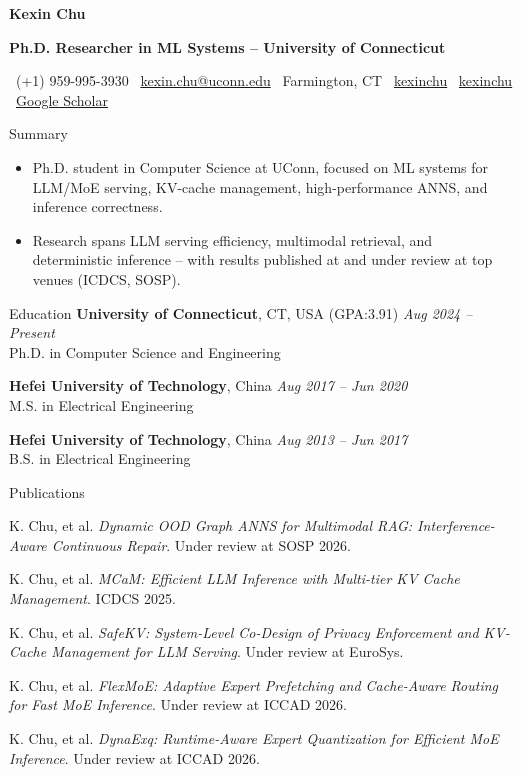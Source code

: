 \documentclass[]{resume}
\newcommand{\sectionvspace}{\vspace{1.5pt}}
\newcommand{\MakeHeader}[8]{%
\noindent
{\centering \bfseries \LARGE #1 \par}
\vspace{2pt}

\noindent
\colorbox{HeaderOrange}{%
  \parbox{\textwidth}{%
    \vspace{2pt}
    \centering
    {\color{white}\bfseries\normalsize #2}
    \vspace{2pt}
  }%
}\par

\noindent
\colorbox{HeaderLight}{%
  \parbox{\textwidth}{%
    \vspace{2pt}
    \small
    \faPhone\ #3 \hfill
    \faEnvelope\ \href{mailto:#4}{#4} \hfill
    \faMapMarker*\ #5 \hfill
    \faLinkedin\ \href{#6}{kexinchu} \hfill
    \faGithub\ \href{#7}{kexinchu} \hfill
    \faGraduationCap\ \href{#8}{Google Scholar}
    \vspace{2pt}
  }%
}\par
}
\begin{document}
\MakeHeader
{Kexin Chu}
{Ph.D. Researcher in ML Systems -- University of Connecticut}
{(+1) 959-995-3930}
{kexin.chu@uconn.edu}
{Farmington, CT}
{https://www.linkedin.com/in/kexin-chu-69a481192}
{https://kexinchu.github.io/}
{https://scholar.google.com/citations?user=ZIdS3d0AAAAJ}

\begin{rSection}{Summary}\sectionvspace
\begin{itemize}[leftmargin=1.2em, itemsep=0.15em, topsep=0.2em]
    \item Ph.D. student in Computer Science at UConn, focused on ML systems for LLM/MoE serving, KV-cache management, high-performance ANNS, and inference correctness.
    \item Research spans LLM serving efficiency, multimodal retrieval, and deterministic inference -- with results published at and under review at top venues (ICDCS, SOSP).
\end{itemize}
\end{rSection}

\begin{rSection}{Education}\sectionvspace
\textbf{University of Connecticut}, CT, USA  (GPA:3.91) \hfill \textit{Aug 2024 -- Present}\\
Ph.D. in Computer Science and Engineering

\textbf{Hefei University of Technology}, China \hfill \textit{Aug 2017 -- Jun 2020}\\
M.S. in Electrical Engineering

\textbf{Hefei University of Technology}, China \hfill \textit{Aug 2013 -- Jun 2017}\\
B.S. in Electrical Engineering
\end{rSection}

\begin{rSection}{Publications}\sectionvspace
\item K. Chu, et al. \textit{Dynamic OOD Graph ANNS for Multimodal RAG: Interference-Aware Continuous Repair}. Under review at SOSP 2026.
\item K. Chu, et al. \textit{MCaM: Efficient LLM Inference with Multi-tier KV Cache Management}. ICDCS 2025.
\item K. Chu, et al. \textit{SafeKV: System-Level Co-Design of Privacy Enforcement and KV-Cache Management for LLM Serving}. Under review at EuroSys.
\item K. Chu, et al. \textit{FlexMoE: Adaptive Expert Prefetching and Cache-Aware Routing for Fast MoE Inference}. Under review at ICCAD 2026.
\item K. Chu, et al. \textit{DynaExq: Runtime-Aware Expert Quantization for Efficient MoE Inference}. Under review at ICCAD 2026.
\end{rSection}
\end{document}

